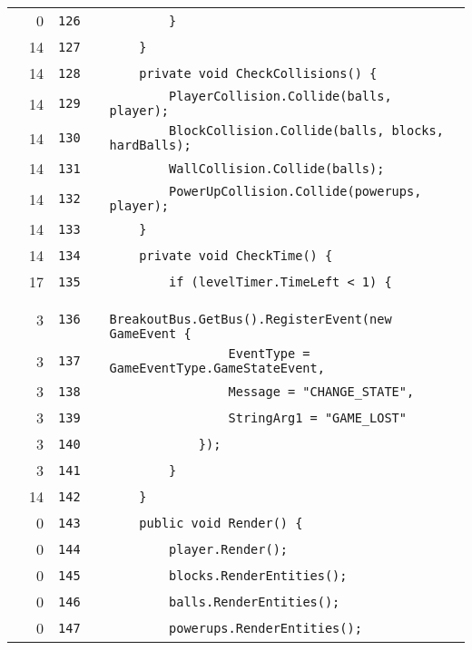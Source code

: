 \documentclass[a4paper,landscape,10pt]{article}
\begin{document}
\begin{longtable}[l]{lrrll}
\cellcolor{red} & 0 & \verb~126~ & & \verb~        }~\\
\cellcolor{green} & 14 & \verb~127~ & & \verb~    }~\\
\cellcolor{green} & 14 & \verb~128~ & & \verb~    private void CheckCollisions() {~\\
\cellcolor{green} & 14 & \verb~129~ & & \verb~        PlayerCollision.Collide(balls, player);~\\
\cellcolor{green} & 14 & \verb~130~ & & \verb~        BlockCollision.Collide(balls, blocks, hardBalls);~\\
\cellcolor{green} & 14 & \verb~131~ & & \verb~        WallCollision.Collide(balls);~\\
\cellcolor{green} & 14 & \verb~132~ & & \verb~        PowerUpCollision.Collide(powerups, player);~\\
\cellcolor{green} & 14 & \verb~133~ & & \verb~    }~\\
\cellcolor{green} & 14 & \verb~134~ & & \verb~    private void CheckTime() {~\\
\cellcolor{green} & 17 & \verb~135~ & & \verb~        if (levelTimer.TimeLeft < 1) {~\\
\cellcolor{green} & 3 & \verb~136~ & & \verb~            BreakoutBus.GetBus().RegisterEvent(new GameEvent {~\\
\cellcolor{green} & 3 & \verb~137~ & & \verb~                EventType = GameEventType.GameStateEvent,~\\
\cellcolor{green} & 3 & \verb~138~ & & \verb~                Message = "CHANGE_STATE",~\\
\cellcolor{green} & 3 & \verb~139~ & & \verb~                StringArg1 = "GAME_LOST"~\\
\cellcolor{green} & 3 & \verb~140~ & & \verb~            });~\\
\cellcolor{green} & 3 & \verb~141~ & & \verb~        }~\\
\cellcolor{green} & 14 & \verb~142~ & & \verb~    }~\\
\cellcolor{red} & 0 & \verb~143~ & & \verb~    public void Render() {~\\
\cellcolor{red} & 0 & \verb~144~ & & \verb~        player.Render();~\\
\cellcolor{red} & 0 & \verb~145~ & & \verb~        blocks.RenderEntities();~\\
\cellcolor{red} & 0 & \verb~146~ & & \verb~        balls.RenderEntities();~\\
\cellcolor{red} & 0 & \verb~147~ & & \verb~        powerups.RenderEntities();~\\

\end{longtable}
\end{document}
